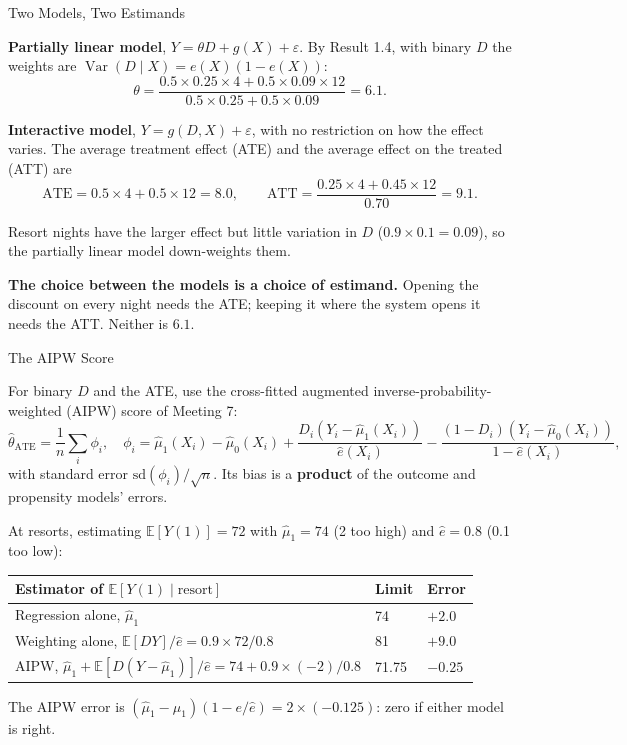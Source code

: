 \documentclass[aspectratio=169, 11pt, handout]{beamer}
\newcommand{\E}{\mathbb{E}}
\newcommand{\Var}{\operatorname{Var}}
\newcommand{\ATE}{\text{ATE}}
\newcommand{\ATT}{\text{ATT}}
\begin{document}
\begin{frame}{Two Models, Two Estimands}

\textbf{Partially linear model}, $Y = \theta D + g(X) + \varepsilon$. By Result 1.4, with binary $D$ the weights are $\Var(D \mid X) = e(X)(1 - e(X))$:
\[
\theta = \frac{0.5 \times 0.25 \times 4 + 0.5 \times 0.09 \times 12}{0.5 \times 0.25 + 0.5 \times 0.09} = 6.1 .
\]

\textbf{Interactive model}, $Y = g(D, X) + \varepsilon$, with no restriction on how the effect varies. The average treatment effect (ATE) and the average effect on the treated (ATT) are
\[
\ATE = 0.5 \times 4 + 0.5 \times 12 = 8.0, \qquad \ATT = \frac{0.25 \times 4 + 0.45 \times 12}{0.70} = 9.1 .
\]

\bigskip

Resort nights have the larger effect but little variation in $D$ ($0.9 \times 0.1 = 0.09$), so the partially linear model down-weights them.

\medskip

\textbf{The choice between the models is a choice of estimand.} Opening the discount on every night needs the ATE; keeping it where the system opens it needs the ATT. Neither is $6.1$.
\end{frame}

\begin{frame}{The AIPW Score}

For binary $D$ and the ATE, use the cross-fitted augmented inverse-probability-weighted (AIPW) score of Meeting 7:
\[
  \hat\theta_{\ATE} = \frac1n\sum_i\phi_i, \quad
  \phi_i = \hat\mu_1(X_i) - \hat\mu_0(X_i) + \frac{D_i(Y_i - \hat\mu_1(X_i))}{\hat e(X_i)} - \frac{(1-D_i)(Y_i - \hat\mu_0(X_i))}{1 - \hat e(X_i)},
\]
with standard error $\text{sd}(\phi_i)/\sqrt n$. Its bias is a \textbf{product} of the outcome and propensity models' errors.

\medskip

At resorts, estimating $\E[Y(1)] = 72$ with $\hat\mu_1 = 74$ (2 too high) and $\hat e = 0.8$ (0.1 too low):

\begin{center}
\small
\begin{tabular}{lll}
\toprule
\textbf{Estimator of $\E[Y(1) \mid \text{resort}]$} & \textbf{Limit} & \textbf{Error} \\
\midrule
Regression alone, $\hat\mu_1$ & 74 & $+2.0$ \\
Weighting alone, $\E[DY]/\hat e = 0.9 \times 72/0.8$ & 81 & $+9.0$ \\
AIPW, $\hat\mu_1 + \E[D(Y - \hat\mu_1)]/\hat e = 74 + 0.9 \times (-2)/0.8$ & 71.75 & $-0.25$ \\
\bottomrule
\end{tabular}
\end{center}

\smallskip
The AIPW error is $(\hat\mu_1 - \mu_1)(1 - e/\hat e) = 2 \times (-0.125)$: zero if either model is right.
\end{frame}
\end{document}

